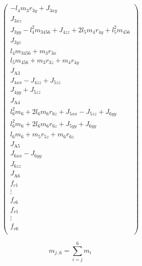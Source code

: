 {\begin{equation}
\begin{pmatrix}
			-l_4 m_3 r_{3y} + J_{3xy} \\
			J_{3xz} \\
			J_{3yy} - l_4^2 m_{3456} + J_{4zz} + 2l_5 m_4 r_{4y} + l_5^2 m_{456} \\
			J_{3yz} \\
			l_4 m_{3456} + m_3 r_{3x} \\
			l_5 m_{456} + m_3 r_{3z} + m_4 r_{4y} \\
			J_{\text{A}3} \\
			J_{4xx} - J_{4zz} + J_{5zz} \\
			J_{4yy} + J_{5zz} \\
			J_{\text{A}4} \\
			l_6^2 m_6 + 2 l_6 m_6 r_{6z} + J_{5xx} - J_{5zz} + J_{6yy} \\
			l_6^2 m_6 + 2 l_6 m_6 r_{6z} + J_{5yy} + J_{6yy} \\
			l_6 m_6 + m_5 r_{5z} + m_6 r_{6z} \\
			J_{\text{A}5} \\
			J_{6xx} - J_{6yy} \\
			J_{6zz} \\
			J_{\text{A}6} \\
			
			f_{c1} \\
			\vdots \\
			f_{c6} \\
			
			f_{v1} \\
            \vdots \\
			f_{v6} \\
		\end{pmatrix}
\end{equation}
}


\begin{equation}
\label{eq:MassenSumme}
    m_{j..6}=\sum_{i=j}^{6} m_i
\end{equation}